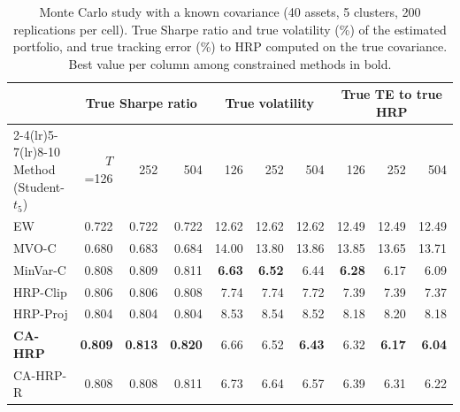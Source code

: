 \begin{table}[!htbp]\centering\small
\caption{Monte Carlo study with a known covariance (40 assets, 5 clusters, 200 replications per cell). True Sharpe ratio and true volatility (\%) of the estimated portfolio, and true tracking error (\%) to HRP computed on the true covariance. Best value per column among constrained methods in bold.}\label{tab:mc}
\setlength{\tabcolsep}{4pt}\begin{tabular}{l rrr rrr rrr}\toprule
 & \multicolumn{3}{c}{True Sharpe ratio} & \multicolumn{3}{c}{True volatility} & \multicolumn{3}{c}{True TE to true HRP}\\
\cmidrule(lr){2-4}\cmidrule(lr){5-7}\cmidrule(lr){8-10}
Method (Student-$t_5$) & $T$=126 & 252 & 504 & 126 & 252 & 504 & 126 & 252 & 504\\\midrule
EW & 0.722 & 0.722 & 0.722 & 12.62 & 12.62 & 12.62 & 12.49 & 12.49 & 12.49\\
MVO-C & 0.680 & 0.683 & 0.684 & 14.00 & 13.80 & 13.86 & 13.85 & 13.65 & 13.71\\
MinVar-C & 0.808 & 0.809 & 0.811 & \textbf{6.63} & \textbf{6.52} & 6.44 & \textbf{6.28} & 6.17 & 6.09\\
HRP-Clip & 0.806 & 0.806 & 0.808 & 7.74 & 7.74 & 7.72 & 7.39 & 7.39 & 7.37\\
HRP-Proj & 0.804 & 0.804 & 0.804 & 8.53 & 8.54 & 8.52 & 8.18 & 8.20 & 8.18\\
\textbf{CA-HRP} & \textbf{0.809} & \textbf{0.813} & \textbf{0.820} & 6.66 & 6.52 & \textbf{6.43} & 6.32 & \textbf{6.17} & \textbf{6.04}\\
CA-HRP-R & 0.808 & 0.808 & 0.811 & 6.73 & 6.64 & 6.57 & 6.39 & 6.31 & 6.22\\
\bottomrule\end{tabular}\end{table}